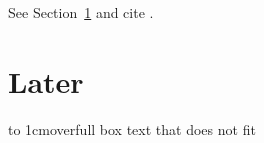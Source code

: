 \documentclass{article}
\begin{document}
See Section~\ref{later} and cite \cite{nobody}.
\section{Later}\label{later}
\hbox to 1cm{overfull box text that does not fit}
\end{document}
